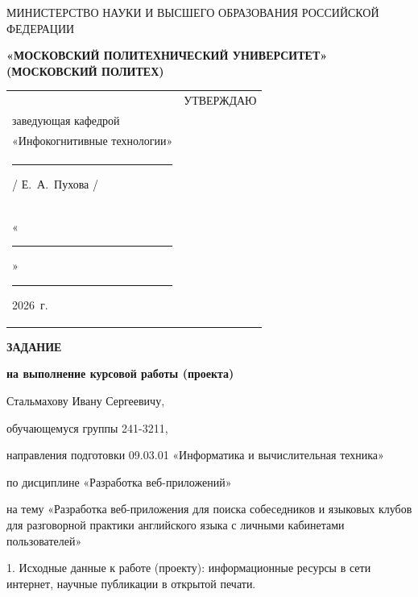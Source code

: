 \documentclass[14pt, a4paper]{extarticle}
\begin{document}
\pagestyle{empty}


\begin{center}
    {\small МИНИСТЕРСТВО НАУКИ И ВЫСШЕГО ОБРАЗОВАНИЯ РОССИЙСКОЙ ФЕДЕРАЦИИ}


    {\small \textbf{«МОСКОВСКИЙ ПОЛИТЕХНИЧЕСКИЙ УНИВЕРСИТЕТ»}} \\
    {\small \textbf{(МОСКОВСКИЙ ПОЛИТЕХ)}}
\end{center}

\begin{tabularx}{\textwidth}{@{} p{} p{} @{}}
     &
    \raggedright
    УТВЕРЖДАЮ                          \\
    заведующая кафедрой                \\
    «Инфокогнитивные технологии»       \\[0.3cm]

    \rule{3cm}{0.4pt} / Е.~А.~Пухова / \\[0.1cm]

    «\rule{0.8cm}{0.4pt}» \rule{3cm}{0.4pt} 2026~г.
\end{tabularx}


\begin{center}

    { \large \textbf{ЗАДАНИЕ}}

    \textbf{на выполнение курсовой работы (проекта)}

    Стальмахову Ивану Сергеевичу, %

\end{center}

обучающемуся группы 241-3211,

направления подготовки 09.03.01 «Информатика и вычислительная техника»

по дисциплине «Разработка веб-приложений»

на тему «Разработка веб-приложения для поиска собеседников и языковых клубов
для разговорной практики английского языка с личными кабинетами пользователей»

1. Исходные данные к работе (проекту): информационные ресурсы в сети
интернет, научные публикации в открытой печати.
\end{document}
